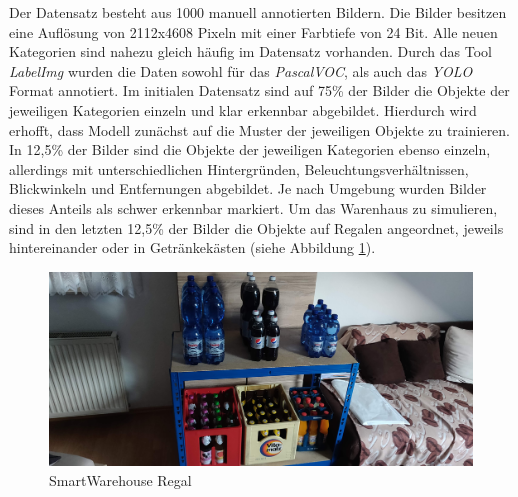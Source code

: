 Der Datensatz besteht aus 1000 manuell annotierten Bildern. Die Bilder besitzen eine Auflösung von 2112x4608 Pixeln mit einer Farbtiefe von 24 Bit. Alle neuen Kategorien sind nahezu gleich häufig im Datensatz vorhanden. Durch das Tool \textit{LabelImg} wurden die Daten sowohl für das \textit{PascalVOC}, als auch das \textit{YOLO} Format annotiert. Im initialen Datensatz sind auf 75\% der Bilder die Objekte der jeweiligen Kategorien einzeln und klar erkennbar abgebildet. Hierdurch wird erhofft, dass Modell zunächst auf die Muster der jeweiligen Objekte zu trainieren. In 12,5\% der Bilder sind die Objekte der jeweiligen Kategorien ebenso einzeln, allerdings mit unterschiedlichen Hintergründen, Beleuchtungsverhältnissen, Blickwinkeln und Entfernungen abgebildet. Je nach Umgebung wurden Bilder dieses Anteils als schwer erkennbar markiert. Um das Warenhaus zu simulieren, sind in den letzten 12,5\% der Bilder die Objekte auf Regalen angeordnet, jeweils hintereinander oder in Getränkekästen (siehe Abbildung \ref{regal}). 

\begin{figure}[ht]
	\begin{center}
		\includegraphics[width=16cm]{Bilder/regal.jpg} 
		\caption[Smart Warehouse Regal]{SmartWarehouse Regal}
		\label{regal}
	\end{center}
\end{figure}